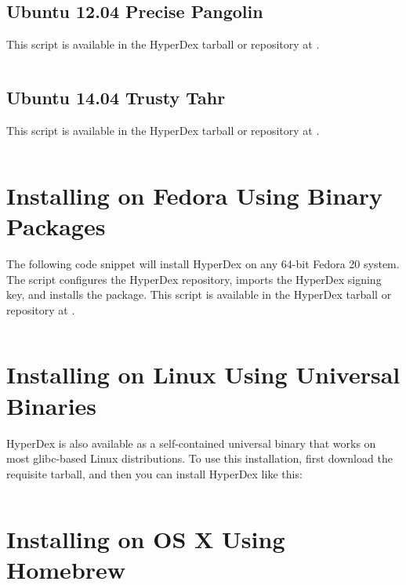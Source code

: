 \subsection{Ubuntu 12.04 Precise Pangolin}

This script is available in the HyperDex tarball or repository at
.

\inputminted[frame=lines,framesep=2mm,firstline=5]{bash}{\topdir/install/ubuntu12.04-packages.sh}

\subsection{Ubuntu 14.04 Trusty Tahr}

This script is available in the HyperDex tarball or repository at
.

\inputminted[frame=lines,framesep=2mm,firstline=5]{bash}{\topdir/install/ubuntu14.04-packages.sh}

\section{Installing on Fedora Using Binary Packages}

The following code snippet will install HyperDex on any 64-bit Fedora 20 system.
The script configures the HyperDex repository, imports the HyperDex signing key,
and installs the  package.  This script is available in the
HyperDex tarball or repository at .

\inputminted[frame=lines,framesep=2mm,firstline=5]{bash}{\topdir/install/fedora-packages.sh}

\section{Installing on Linux Using Universal Binaries}
\label{sec:installation:universal-linux}

HyperDex is also available as a self-contained universal binary that works on
most glibc-based Linux distributions.  To use this installation, first download
the requisite tarball, and then you can install HyperDex like this:

\inputminted[frame=lines,framesep=2mm,firstline=3]{bash}{\topdir/install/linux-amd64.sh}

\section{Installing on OS X Using Homebrew}
\label{sec:installation:os-x-homebrew}

